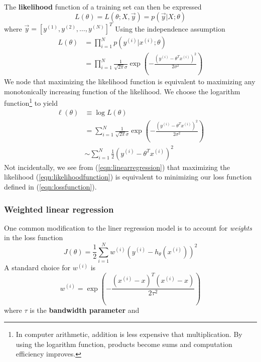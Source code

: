 \documentclass{article}
\theoremstyle{definition}
\theoremstyle{remark}
\begin{document}
The \textbf{likelihood} function of a training set can then be expressed
\begin{equation}
    L(\theta) = L(\theta; X, \vec{y}) = p (\vec{y}|X;\theta)
\end{equation}
where $\vec{y} = {[y^{(1)}, y^{(2)}, \dots, y^{(N)}]}^{T}$
Using the independence assumption
\begin{align}
    L(\theta) &= \prod_{i=1}^{N}p(y^{(i)}|x^{(i)}; \theta) \nonumber \\
    &= \prod_{i=1}^{N} \frac{1}{\sqrt{2\pi}\sigma}\exp\left(-\frac{{(y^{(i)} - \theta^{T}x^{(i)})}^{2}}{2\sigma^{2}}\right) 
\end{align}
We node that maximizing the likelihood function is equivalent to maximizing any monotonically increasing function of the likelihood.
We choose the logarithm function\footnote{In computer arithmetic, addition is less expensive that multiplication. 
By using the logarithm function, products become sums and computation efficiency improves.} to yield
\begin{align}
    \ell(\theta) &\equiv \log L(\theta) \nonumber \\
    &= \sum_{i=1}^{N} \frac{1}{\sqrt{2\pi}\sigma}\exp\left(-\frac{{(y^{(i)} - \theta^{T}x^{(i)})}^{2}}{2\sigma^{2}}\right) \nonumber \\
    &\sim \sum_{i=1}^{N}\frac{1}{2}{\left(y^{(i)} - \theta^{T}x^{(i)}\right)}^{2} \label{eqn:likelihoodfunction}
  \end{align}
Not incidentally, we see from (\ref{eqn:linearregression}) that maximizing the likelihood  (\ref{eqn:likelihoodfunction}) is equivalent to minimizing our loss function defined in (\ref{eqn:lossfunction}).

\subsubsection{Weighted linear regression}
One common modification to the liner regression model is to account for \textit{weights} in the loss function
\begin{equation}
  J(\theta) = \frac{1}{2}\sum_{i=1}^{N}w^{(i)}{\left(y^{(i)} - h_{\theta}(x^{(i)})\right)}^{2}
\end{equation}
A standard choice for $w^{(i)}$ is
\begin{equation}
  w^{(i)} = \exp\left(-\frac{{(x^{(i)} - x)}^{T}(x^{(i)}-x)}{2\tau^{2}}\right)
\end{equation}
where $\tau$ is the \textbf{bandwidth parameter} and  
\end{document}
